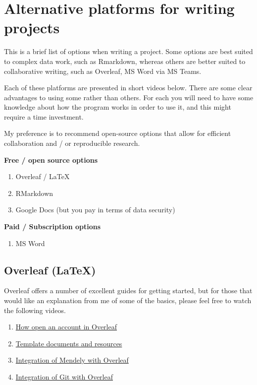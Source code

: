 \documentclass[
]{book}
\providecommand{\tightlist}{%
  \setlength{\itemsep}{0pt}\setlength{\parskip}{0pt}}
\begin{document}
\hypertarget{alternative-platforms-for-writing-projects}{%
\chapter{Alternative platforms for writing projects}\label{alternative-platforms-for-writing-projects}}

This is a brief list of options when writing a project. Some options are best suited to complex data work, such as Rmarkdown, whereas others are better suited to collaborative writing, such as Overleaf, MS Word via MS Teams.

Each of these platforms are presented in short videos below. There are some clear advantages to using some rather than others. For each you will need to have some knowledge about how the program works in order to use it, and this might require a time investment.

My preference is to recommend open-source options that allow for efficient collaboration and / or reproducible research.

\textbf{Free / open source options}

\begin{enumerate}
\def\labelenumi{\arabic{enumi}.}
\item
  Overleaf / LaTeX
\item
  RMarkdown
\item
  Google Docs (but you pay in terms of data security)
\end{enumerate}

\textbf{Paid / Subscription options}

\begin{enumerate}
\def\labelenumi{\arabic{enumi}.}
\tightlist
\item
  MS Word
\end{enumerate}

\hypertarget{overleaf-latex}{%
\section{Overleaf (LaTeX)}\label{overleaf-latex}}

Overleaf offers a number of excellent guides for getting started, but for those that would like an explanation from me of some of the basics, please feel free to watch the following videos.

\begin{enumerate}
\def\labelenumi{\arabic{enumi}.}
\item
  \href{}{How open an account in Overleaf}
\item
  \href{}{Template documents and resources}
\item
  \href{}{Integration of Mendely with Overleaf}
\item
  \href{}{Integration of Git with Overleaf}
\end{enumerate}
\end{document}
